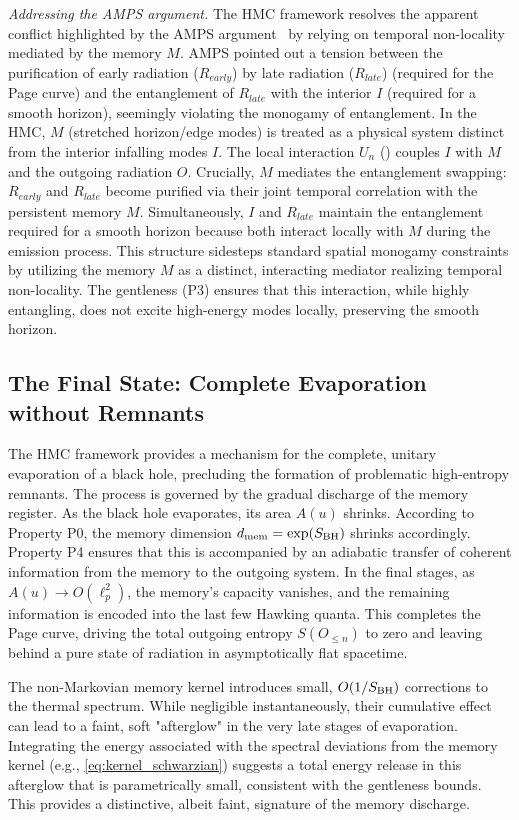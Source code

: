 \documentclass[a4paper,11pt]{article}
\newcommand{\eg}{e.g.\xspace}
\newcommand{\HMC}{\textup{\textsc{HMC}}\xspace}
\theoremstyle{plain}
\theoremstyle{definition}
\theoremstyle{remark}
\begin{document}
\textit{Addressing the AMPS argument.} The \HMC{} framework resolves the apparent conflict highlighted by the AMPS argument~\cite{AMPS:2013} by relying on temporal non-locality mediated by the memory $M$. AMPS pointed out a tension between the purification of early radiation ($R_{early}$) by late radiation ($R_{late}$) (required for the Page curve) and the entanglement of $R_{late}$ with the interior $I$ (required for a smooth horizon), seemingly violating the monogamy of entanglement. In the \HMC{}, $M$ (stretched horizon/edge modes) is treated as a physical system distinct from the interior infalling modes $I$. The local interaction $U_n$ () couples $I$ with $M$ and the outgoing radiation $O$. Crucially, $M$ mediates the entanglement swapping: $R_{early}$ and $R_{late}$ become purified via their joint temporal correlation with the persistent memory $M$. Simultaneously, $I$ and $R_{late}$ maintain the entanglement required for a smooth horizon because both interact locally with $M$ during the emission process. This structure sidesteps standard spatial monogamy constraints by utilizing the memory $M$ as a distinct, interacting mediator realizing temporal non-locality. The gentleness (P3) ensures that this interaction, while highly entangling, does not excite high-energy modes locally, preserving the smooth horizon.

\subsection{The Final State: Complete Evaporation without Remnants}
\label{sec:end_state}
The \HMC{} framework provides a mechanism for the complete, unitary evaporation of a black hole, precluding the formation of problematic high-entropy remnants. The process is governed by the gradual discharge of the memory register.
As the black hole evaporates, its area $A(u)$ shrinks. According to Property P0, the memory dimension $d_{\rm mem} = \exp(S_{\rm BH})$ shrinks accordingly. Property P4 ensures that this is accompanied by an adiabatic transfer of coherent information from the memory to the outgoing system. In the final stages, as $A(u)\to O(\ell_p^2)$, the memory's capacity vanishes, and the remaining information is encoded into the last few Hawking quanta. This completes the Page curve, driving the total outgoing entropy $S(O_{\le n})$ to zero and leaving behind a pure state of radiation in asymptotically flat spacetime.

The non-Markovian memory kernel introduces small, $O(1/S_{\rm BH})$ corrections to the thermal spectrum. While negligible instantaneously, their cumulative effect can lead to a faint, soft "afterglow" in the very late stages of evaporation. Integrating the energy associated with the spectral deviations from the memory kernel (\eg, \eqref{eq:kernel_schwarzian}) suggests a total energy release in this afterglow that is parametrically small, consistent with the gentleness bounds. This provides a distinctive, albeit faint, signature of the memory discharge.
\end{document}
